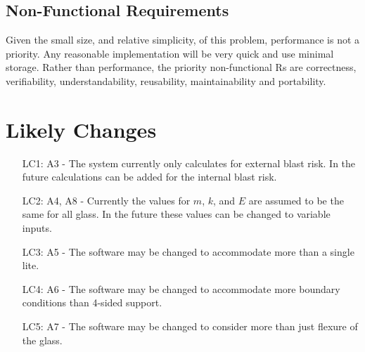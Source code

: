 \documentclass[12pt]{article}
\begin{document}
\subsection{Non-Functional Requirements}
\label{Sec:Non-Requ}
Given the small size, and relative simplicity, of this problem, performance is not a priority. Any reasonable implementation will be very quick and use minimal storage. Rather than performance, the priority non-functional Rs are correctness, verifiability, understandability, reusability, maintainability and portability.
\section{Likely Changes}
\label{Sec:LikeChan}
\begin{itemize}
\item[LC1:]A3 - The system currently only calculates for external blast risk. In the future calculations can be added for the internal blast risk.
\item[LC2:]A4, A8 - Currently the values for $m$, $k$, and $E$ are assumed to be the same for all glass. In the future these values can be changed to variable inputs.
\item[LC3:]A5 - The software may be changed to accommodate more than a single lite.
\item[LC4:]A6 - The software may be changed to accommodate more boundary conditions than 4-sided support.
\item[LC5:]A7 - The software may be changed to consider more than just flexure of the glass.
\end{itemize}
\end{document}
